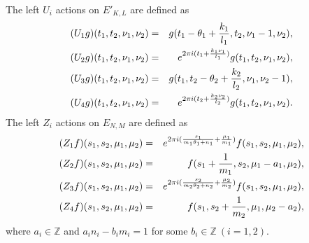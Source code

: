 \documentclass[12pt, a4paper]{article}
\newcommand{\Z}{{\mathbb Z}}
\begin{document}
The left $U_i$ actions on $E'_{K,L}$ are defined as
\begin{eqnarray} \label{ULactions}
(U_1g)(t_1,t_2,\nu_1,\nu_2)&=&
                 g(t_1  - \theta_1 + \frac{k_1}{l_1},t_2,\nu_1-1,\nu_2), \notag \\
(U_2g)(t_1,t_2,\nu_1,\nu_2)&=& e^{2\pi i(t_1 + \frac{k_1
    \nu_1}{l_1} )} g(t_1,t_2,\nu_1,\nu_2), \notag \\
(U_3g)(t_1,t_2,\nu_1,\nu_2)&=&
                 g(t_1,t_2 - \theta_2 + \frac{k_2}{l_2},\nu_1,\nu_2-1), \notag \\
(U_4g)(t_1,t_2,\nu_1,\nu_2)&=& e^{2\pi i(t_2 + \frac{k_2
   \nu_2}{l_2} )} g(t_1,t_2,\nu_1,\nu_2) .
\end{eqnarray}
The left $Z_i$ actions on $E_{N,M}$ are defined as
\begin{eqnarray} \label{ZLactions}
(Z_1f)(s_1,s_2,\mu_1,\mu_2)&=& e^{2\pi i(\frac{s_1}{m_1 \theta_1
                +n_1} + \frac{\mu_1}{m_1} )} f(s_1,s_2,\mu_1,\mu_2), \notag \\
(Z_2f)(s_1,s_2,\mu_1,\mu_2)&=& f(s_1 + \frac{1}{m_1},s_2,\mu_1 -a_1,\mu_2),\notag \\
(Z_3f)(s_1,s_2,\mu_1,\mu_2)&=& e^{2\pi i(\frac{s_2}{m_2 \theta_2 +
            n_2}  + \frac{\mu_2}{m_2} )}  f(s_1,s_2,\mu_1,\mu_2), \notag \\
(Z_4f)(s_1,s_2,\mu_1,\mu_2)&=& f(s_1,s_2 +
         \frac{1}{m_2},\mu_1,\mu_2-a_2),
\end{eqnarray}
where $a_i \in \Z$ and $a_i n_i -b_im_i =1 $ for some $b_i \in \Z
\ (i=1,2) . $
\end{document}
